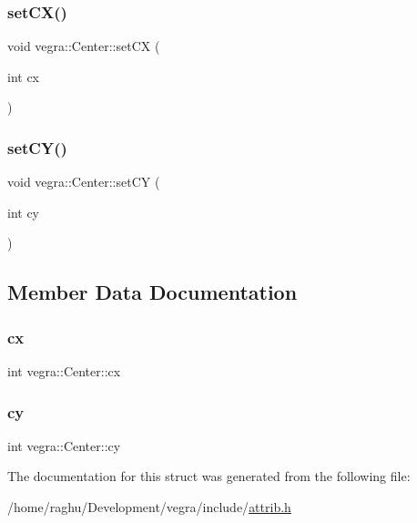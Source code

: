 \subsubsection{\texorpdfstring{set\+C\+X()}{setCX()}}
{\footnotesize\ttfamily void vegra\+::\+Center\+::set\+CX (\begin{DoxyParamCaption}\item[{int}]{cx }\end{DoxyParamCaption})\hspace{0.3cm}{\ttfamily [inline]}}

\mbox{\label{structvegra_1_1Center_a0d726648f4ab1ea9bbcbd43ee0248e52}} 
\subsubsection{\texorpdfstring{set\+C\+Y()}{setCY()}}
{\footnotesize\ttfamily void vegra\+::\+Center\+::set\+CY (\begin{DoxyParamCaption}\item[{int}]{cy }\end{DoxyParamCaption})\hspace{0.3cm}{\ttfamily [inline]}}



\subsection{Member Data Documentation}
\mbox{\label{structvegra_1_1Center_a336735442bd468d062343de6329771e7}} 
\subsubsection{\texorpdfstring{cx}{cx}}
{\footnotesize\ttfamily int vegra\+::\+Center\+::cx}

\mbox{\label{structvegra_1_1Center_a2dab1c0677aaf7d4c13922cbd8c19a0b}} 
\subsubsection{\texorpdfstring{cy}{cy}}
{\footnotesize\ttfamily int vegra\+::\+Center\+::cy}



The documentation for this struct was generated from the following file\+:\begin{DoxyCompactItemize}
\item 
/home/raghu/\+Development/vegra/include/\mbox{\hyperlink{attrib_8h}{attrib.\+h}}\end{DoxyCompactItemize}
